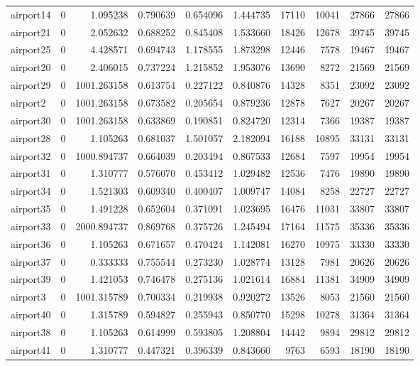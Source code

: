 \begin{longtable}{|l|r|r|r|r|r|r|r|r|r|}
airport14 & 0 & 1.095238 & 0.790639 & 0.654096 & 1.444735 & 17110 & 10041 & 27866 & 27866 \\
airport21 & 0 & 2.052632 & 0.688252 & 0.845408 & 1.533660 & 18426 & 12678 & 39745 & 39745 \\
airport25 & 0 & 4.428571 & 0.694743 & 1.178555 & 1.873298 & 12446 & 7578 & 19467 & 19467 \\
airport20 & 0 & 2.406015 & 0.737224 & 1.215852 & 1.953076 & 13690 & 8272 & 21569 & 21569 \\
airport29 & 0 & 1001.263158 & 0.613754 & 0.227122 & 0.840876 & 14328 & 8351 & 23092 & 23092 \\
airport2 & 0 & 1001.263158 & 0.673582 & 0.205654 & 0.879236 & 12878 & 7627 & 20267 & 20267 \\
airport30 & 0 & 1001.263158 & 0.633869 & 0.190851 & 0.824720 & 12314 & 7366 & 19387 & 19387 \\
airport28 & 0 & 1.105263 & 0.681037 & 1.501057 & 2.182094 & 16188 & 10895 & 33131 & 33131 \\
airport32 & 0 & 1000.894737 & 0.664039 & 0.203494 & 0.867533 & 12684 & 7597 & 19954 & 19954 \\
airport31 & 0 & 1.310777 & 0.576070 & 0.453412 & 1.029482 & 12536 & 7476 & 19890 & 19890 \\
airport34 & 0 & 1.521303 & 0.609340 & 0.400407 & 1.009747 & 14084 & 8258 & 22727 & 22727 \\
airport35 & 0 & 1.491228 & 0.652604 & 0.371091 & 1.023695 & 16476 & 11031 & 33807 & 33807 \\
airport33 & 0 & 2000.894737 & 0.869768 & 0.375726 & 1.245494 & 17164 & 11575 & 35336 & 35336 \\
airport36 & 0 & 1.105263 & 0.671657 & 0.470424 & 1.142081 & 16270 & 10975 & 33330 & 33330 \\
airport37 & 0 & 0.333333 & 0.755544 & 0.273230 & 1.028774 & 13128 & 7981 & 20626 & 20626 \\
airport39 & 0 & 1.421053 & 0.746478 & 0.275136 & 1.021614 & 16884 & 11381 & 34909 & 34909 \\
airport3 & 0 & 1001.315789 & 0.700334 & 0.219938 & 0.920272 & 13526 & 8053 & 21560 & 21560 \\
airport40 & 0 & 1.315789 & 0.594827 & 0.255943 & 0.850770 & 15298 & 10278 & 31364 & 31364 \\
airport38 & 0 & 1.105263 & 0.614999 & 0.593805 & 1.208804 & 14442 & 9894 & 29812 & 29812 \\
airport41 & 0 & 1.310777 & 0.447321 & 0.396339 & 0.843660 & 9763 & 6593 & 18190 & 18190 \\

\end{longtable}
